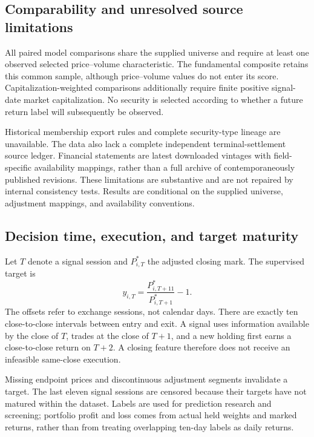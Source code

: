 \documentclass[11pt]{article}
\begin{document}
\subsection{Comparability and unresolved source limitations}
All paired model comparisons share the supplied universe and require at least one observed selected price--volume characteristic. The fundamental composite retains this common sample, although price--volume values do not enter its score. Capitalization-weighted comparisons additionally require finite positive signal-date market capitalization. No security is selected according to whether a future return label will subsequently be observed.

Historical membership export rules and complete security-type lineage are unavailable. The data also lack a complete independent terminal-settlement source ledger. Financial statements are latest downloaded vintages with field-specific availability mappings, rather than a full archive of contemporaneously published revisions. These limitations are substantive and are not repaired by internal consistency tests. Results are conditional on the supplied universe, adjustment mappings, and availability conventions.
\clearpage

\subsection{Decision time, execution, and target maturity}
Let $T$ denote a signal session and $P^*_{i,T}$ the adjusted closing mark. The supervised target is
\begin{equation}
y_{i,T}=\frac{P^*_{i,T+11}}{P^*_{i,T+1}}-1.
\label{eq:target}
\end{equation}
The offsets refer to exchange sessions, not calendar days. There are exactly ten close-to-close intervals between entry and exit. A signal uses information available by the close of $T$, trades at the close of $T+1$, and a new holding first earns a close-to-close return on $T+2$. A closing feature therefore does not receive an infeasible same-close execution.

Missing endpoint prices and discontinuous adjustment segments invalidate a target. The last eleven signal sessions are censored because their targets have not matured within the dataset. Labels are used for prediction research and screening; portfolio profit and loss comes from actual held weights and marked returns, rather than from treating overlapping ten-day labels as daily returns.
\end{document}
